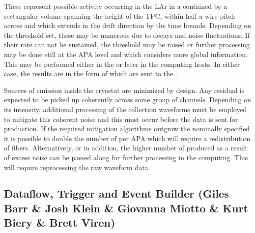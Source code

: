 These  represent possible activity occurring in
the LAr in a contained by a rectangular volume spanning the height of
the TPC, within half a wire pitch across and which extends in the
drift direction by the time bounds. 
Depending on the threshold set, these  may be
numerous due to  decays and noise fluctuations.
If their rate can not be sustained, the threshold may be raised or
further processing may be done still at the APA level and which
considers more global information.
This may be performed either in the  or later in the
 computing hosts. 
In either case, the results are in the form of 
which are sent to the .

Sources of  emission inside the cryostat are minimized by
design. 
Any residual  is expected to be picked up coherently across
some group of channels. 
Depending on its intensity, additional processing of the collection
waveforms must be employed to mitigate this coherent noise and this
must occur before the data is sent for 
production. 
If the required mitigation algorithms outgrow the nominally specified
  it is possible to double the number of
 per APA which will require a redistribution of fibers. 
Alternatively, or in addition, the higher number of
 produced as a result of excess noise can be
passed along for further processing in the  computing. 
This will require reprocessing the raw waveform data.



\subsection{Dataflow, Trigger and Event Builder (Giles Barr \& Josh Klein \& Giovanna Miotto \& Kurt Biery \& Brett Viren)}
\label{sec:fdsp-daq-hlt}


